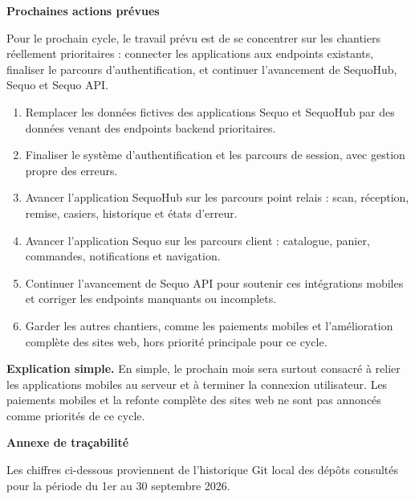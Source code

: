 \documentclass[11pt,letterpaper]{article}
\newcommand{\sectiontitle}[1]{%
  \vspace{0.55em}
  {\Large\bfseries\color{SequoInk}#1}\par
  \vspace{0.1em}
}
\newcommand{\simpleexplanation}[1]{%
  {\small\textbf{\color{SequoBlue}Explication simple.} \color{SequoMuted}#1\par}
}
\begin{document}
\sectiontitle{Prochaines actions prévues}
Pour le prochain cycle, le travail prévu est de se concentrer sur les chantiers réellement prioritaires : connecter les applications aux endpoints existants, finaliser le parcours d'authentification, et continuer l'avancement de SequoHub, Sequo et Sequo API.

\begin{enumerate}
  \item Remplacer les données fictives des applications Sequo et SequoHub par des données venant des endpoints backend prioritaires.
  \item Finaliser le système d'authentification et les parcours de session, avec gestion propre des erreurs.
  \item Avancer l'application SequoHub sur les parcours point relais : scan, réception, remise, casiers, historique et états d'erreur.
  \item Avancer l'application Sequo sur les parcours client : catalogue, panier, commandes, notifications et navigation.
  \item Continuer l'avancement de Sequo API pour soutenir ces intégrations mobiles et corriger les endpoints manquants ou incomplets.
  \item Garder les autres chantiers, comme les paiements mobiles et l'amélioration complète des sites web, hors priorité principale pour ce cycle.
\end{enumerate}

\simpleexplanation{En simple, le prochain mois sera surtout consacré à relier les applications mobiles au serveur et à terminer la connexion utilisateur. Les paiements mobiles et la refonte complète des sites web ne sont pas annoncés comme priorités de ce cycle.}

\sectiontitle{Annexe de traçabilité}
Les chiffres ci-dessous proviennent de l'historique Git local des dépôts consultés pour la période du 1er au 30 septembre 2026.
\end{document}
